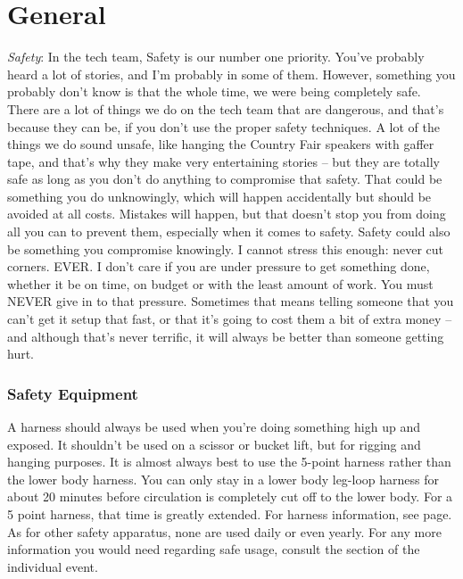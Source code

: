 \documentclass[letterpaper,10pt,oneside,headsepline]{scrreprt}
\begin{document}
\chapter{General}
\textit{Safety}: In the tech team, Safety is our number one priority. You've probably heard a lot of stories, and I'm probably in some of them. However, something you probably don't know is that the whole time, we were being completely safe. There are a lot of things we do on the tech team that are dangerous, and that's because they can be, if you don't use the proper safety techniques. A lot of the things we do sound unsafe, like hanging the Country Fair speakers with gaffer tape, and that's why they make very entertaining stories -- but they are totally safe as long as you don't do anything to compromise that safety. That could be something you do unknowingly, which will happen accidentally but should be avoided at all costs. Mistakes will happen, but that doesn't stop you from doing all you can to prevent them, especially when it comes to safety. Safety could also be something you compromise knowingly. I cannot stress this enough: never cut corners. EVER. I don't care if you are under pressure to get something done, whether it be on time, on budget or with the least amount of work. You must NEVER give in to that pressure. Sometimes that means telling someone that you can't get it setup that fast, or that it's going to cost them a bit of extra money -- and although that's never terrific, it will always be better than someone getting hurt.

\subsection{Safety Equipment}
A harness should always be used when you're doing something high up and exposed. It shouldn't be used on a scissor or bucket lift, but for rigging and hanging purposes. It is almost always best to use the 5-point harness rather than the lower body harness. You can only stay in a lower body leg-loop harness for about 20 minutes before circulation is completely cut off to the lower body. For a 5 point harness, that time is greatly extended. For harness information, see page. As for other safety apparatus, none are used daily or even yearly. For any more information you would need regarding safe usage, consult the section of the individual event.

\end{document}
